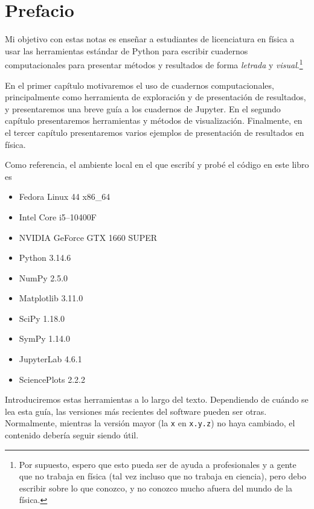 \chapter{Prefacio}

Mi objetivo con estas notas es enseñar a estudiantes de licenciatura en física a usar
las herramientas estándar de Python para escribir cuadernos computacionales para
presentar métodos y resultados de forma \emph{letrada} y \emph{visual}.\footnote{
  Por supuesto, espero que esto pueda ser de ayuda a profesionales y a gente que
  no trabaja en física (tal vez incluso que no trabaja en ciencia), pero debo escribir
  sobre lo que conozco, y no conozco mucho afuera del mundo de la física.
}

En el primer capítulo motivaremos el uso de cuadernos computacionales, principalmente como
herramienta de exploración y de presentación de resultados, y presentaremos una breve guía
a los cuadernos de Jupyter.
En el segundo capítulo presentaremos herramientas y métodos de visualización.
Finalmente, en el tercer capítulo presentaremos varios ejemplos de presentación de resultados
en física.


Como referencia, el ambiente local en el que escribí y probé el código en este libro es
\begin{itemize}
  \item Fedora Linux 44 x86\_64
  \item Intel Core i5--10400F
  \item NVIDIA GeForce GTX 1660 SUPER
  \item Python 3.14.6
  \item NumPy 2.5.0
  \item Matplotlib 3.11.0
  \item SciPy 1.18.0
  \item SymPy 1.14.0
  \item JupyterLab 4.6.1
  \item SciencePlots 2.2.2
\end{itemize}
Introduciremos estas herramientas a lo largo del texto.
Dependiendo de cuándo se lea esta guía, las versiones más recientes del software pueden
ser otras. Normalmente, mientras la versión mayor (la \texttt{x} en \texttt{x.y.z}) no haya cambiado,
el contenido debería seguir siendo útil.

